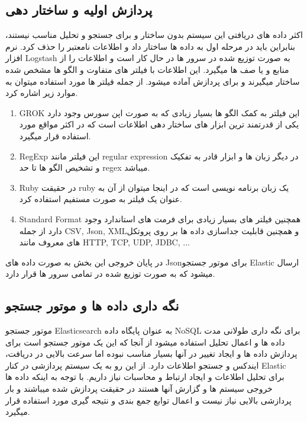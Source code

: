 \documentclass{llncs}
\begin{document}
\subsection{پردازش اولیه و ساختار دهی}
اکثر داده های دریافتی این سیستم بدون ساختار و برای جستجو و تحلیل مناسب نیستند، بنابراین باید در مرحله اول به داده ها ساختار داد و اطلاعات نامعتبر را حذف کرد.
نرم افزار Logstash به صورت توزیع شده در سرور ها در حال کار است و اطلاعات را از منابع و یا صف ها میگیرد.
این اطلاعات با فیلتر های متفاوت و الگو ها مشخص شده ساختار میگیرند و برای پردازش آماده میشود.
از جمله فیلتر ها مورد استفاده میتوان به موارد زیر اشاره کرد.
\begin{enumerate}
    \item GROK
    \newline 
    این فیلتر به کمک الگو ها بسیار زیادی که به صورت اپن سورس وجود دارد یکی از قدرتمند ترین ابزار های ساختار دهی اطلاعات است که در اکثر مواقع مورد استفاده قرار میگیرد.
    \item RegExp
    \newline 
    این فیلتر مانند regular expression در دیگر زبان ها و ابزار قادر به تفکیک و تشخیص الگو ها تا حد regex میباشد.
    \item Ruby
    \newline
    در حقیقت ruby یک زبان برنامه نویسی است که در اینجا میتوان از آن به عنوان یک فیلتر به صورت مستفیم استفاده کرد.
    \item Standard Format
    \newline
    همچنین فیلتر های بسیار زیادی برای فرمت های استاندارد وجود دارد از جمله CSV, Json, XMLو همچنین قابلیت جداسازی داده ها بر روی پروتکل های معروف مانند HTTP, TCP, UDP, JDBC, ...
\end{enumerate}

در پایان خروجی این بخش به صورت داده های Jsonبرای موتور جستجو  Elastic ارسال میشود که به صورت توزیع شده در تمامی سرور ها قرار دارد.

\subsection{نگه داری داده ها و موتور جستجو}
موتور جستجو Elasticsearch به عنوان پایگاه داده NoSQL برای نگه داری طولانی مدت داده ها و اعمال تحلیل استفاده میشود از آنجا که این یک موتور جستجو است برای پردازش داده ها و ایجاد تغییر در آنها بسیار مناسب نبوده اما سرعت بالایی در دریافت، ایندکس و جستجو اطلاعات دارد.
از این رو به یک سیستم پردازشی در کنار Elastic برای تحلیل اطلاعات و ایجاد ارتباط و محاسبات نیاز داریم.
با توجه به اینکه داده ها خروجی سیستم ها و گزارش آنها هستند در حقیقت پردازش شده میباشند و بار پردازشی بالایی نیاز نیست و اعمال توابع جمع بندی و نتیجه گیری مورد استفاده قرار میگیرد.
\end{document}
